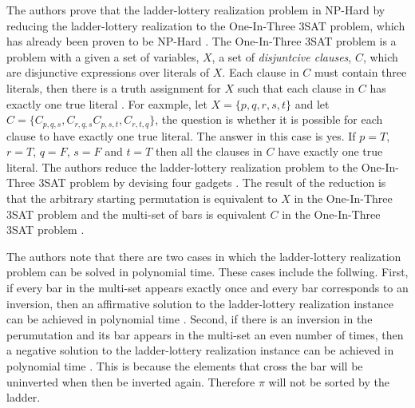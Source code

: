 \pagebreak
The authors prove that the ladder-lottery realization problem in NP-Hard
by reducing the ladder-lottery realization to the One-In-Three 3SAT problem, 
which has already been proven to be NP-Hard \cite{A3}. The One-In-Three 3SAT 
problem is a problem with a given a set of variables, $X$, a set 
of \emph{disjuntcive clauses}, $C$, which are disjunctive expressions over 
literals of $X$. Each clause in $C$ 
must contain three literals, then there is a truth assignment for $X$ such that 
each clause in $C$ has exactly one true literal \cite{A17}. For eaxmple, let 
$X=\{p, q, r, s, t\}$ and let $C=\{C_{p,q,s}, C_{r,q,s} C_{p,s,t}, C_{r,t,q}\}$,
the question is whether it is possible for each clause to have exactly one
true literal. The answer in this case is yes. If $p=T$, $r=T$, $q=F$, $s=F$
 and $t=T$ then all the clauses in $C$ have exactly one true literal. 
 The authors reduce the ladder-lottery realization problem to the
One-In-Three 3SAT problem by devising four gadgets \cite{A3}. The result of 
the reduction is that the arbitrary starting permutation is equivalent 
to $X$ in the One-In-Three 3SAT 
problem and the multi-set of bars is equivalent $C$ in the One-In-Three 
3SAT problem \cite{A3}.\par 
The authors note that there are two cases in which the ladder-lottery
realization problem can be solved in polynomial time. These cases 
include the follwing. First, if every bar in the multi-set appears
exactly once and every bar corresponds to an inversion, 
then an affirmative solution to the ladder-lottery realization 
instance can be achieved in polynomial time \cite{A3}. 
Second, if there is an inversion in the perumutation and its bar appears in the multi-set an even 
number of times, then a negative solution to
the ladder-lottery realization instance
can be achieved in polynomial time \cite{A3}. This is because the elements that cross the bar will 
be uninverted when then be inverted again. Therefore $\pi$ will not be sorted by the ladder.\par